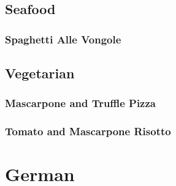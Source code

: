 \documentclass[a4paper, oneside]{book}
\begin{document}
\section{Seafood}

\subsection{Spaghetti Alle Vongole}

\section{Vegetarian}

\subsection{Mascarpone and Truffle Pizza}

\subsection{Tomato and Mascarpone Risotto}

\chapter{German}
\end{document}

